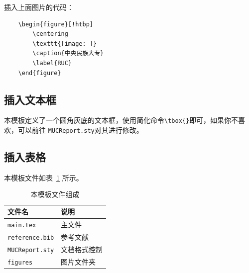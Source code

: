 \documentclass[12pt,hyperref,a4paper,UTF8]{ctexart}
\begin{document}
插入上面图片的代码：

\begin{verbatim}
    \begin{figure}[!htbp]
        \centering
        \texttt{[image: ]}
        \caption{中央民族大专}
        \label{RUC}
    \end{figure}
\end{verbatim}

\subsection{插入文本框}
本模板定义了一个圆角灰底的文本框，使用简化命令\verb|\tbox{}|即可，如果你不喜欢，可以前往 \texttt{MUCReport.sty}对其进行修改。


\subsection{插入表格}
本模板文件如表~\ref{doc} 所示。
\begin{table}[!htbp]
    \caption{本模板文件组成}
    \centering
    \begin{tabular}{l  | l}
    \hline
        文件名 & 说明 \\
        \hline
        \texttt{main.tex}  & 主文件 \\
        \texttt{reference.bib} & 参考文献 \\
        \texttt{MUCReport.sty}  & 文档格式控制\\
        \texttt{figures}  & 图片文件夹 \\
        \hline
    \end{tabular}
    \label{doc}
\end{table}
\end{document}
